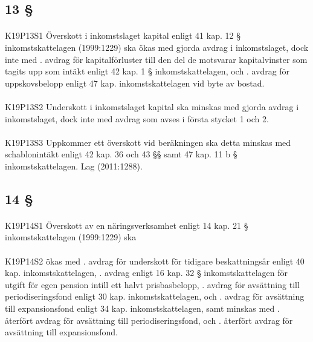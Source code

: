 \documentclass[a4paper,notitlepage,openany,10pt]{book}
\begin{document}
\subsection*{13 §}
\paragraph*{}
{\tiny K19P13S1}
Överskott i inkomstslaget kapital enligt 41 kap. 12 § inkomstskattelagen (1999:1229) ska ökas med gjorda avdrag i inkomstslaget, dock inte med
. avdrag för kapitalförluster till den del de motsvarar kapitalvinster som tagits upp som intäkt enligt 42 kap. 1 § inkomstskattelagen, och
. avdrag för uppskovsbelopp enligt 47 kap. inkomstskattelagen vid byte av bostad.
\paragraph*{}
{\tiny K19P13S2}
Underskott i inkomstslaget kapital ska minskas med gjorda avdrag i inkomstslaget, dock inte med avdrag som avses i första stycket 1 och 2.
\paragraph*{}
{\tiny K19P13S3}
Uppkommer ett överskott vid beräkningen ska detta minskas med schablonintäkt enligt 42 kap. 36 och 43 §§ samt 47 kap. 11 b § inkomstskattelagen.
Lag (2011:1288).
\subsection*{14 §}
\paragraph*{}
{\tiny K19P14S1}
Överskott av en näringsverksamhet enligt 14 kap. 21 § inkomstskattelagen (1999:1229) ska
\paragraph*{}
{\tiny K19P14S2}
ökas med
. avdrag för underskott för tidigare beskattningsår enligt 40 kap. inkomstskattelagen,
. avdrag enligt 16 kap. 32 § inkomstskattelagen för utgift för egen pension intill ett halvt prisbasbelopp,
. avdrag för avsättning till periodiseringsfond enligt 30 kap. inkomstskattelagen, och
. avdrag för avsättning till expansionsfond enligt 34 kap.
inkomstskattelagen,
samt minskas med
. återfört avdrag för avsättning till periodiseringsfond, och
. återfört avdrag för avsättning till expansionsfond.
\end{document}
